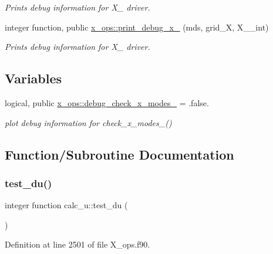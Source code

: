 \begin{DoxyCompactItemize}
\begin{DoxyCompactList}\small\item\em Prints debug information for X\+\_ driver. \end{DoxyCompactList}\item 
integer function, public \hyperlink{namespacex__ops_a8879ea26ad86818e981546c3ab2d6165}{x\+\_\+ops\+::print\+\_\+debug\+\_\+x\+\_} (mds, grid\+\_\+X, X\+\_\+\_\+int)
\begin{DoxyCompactList}\small\item\em Prints debug information for X\+\_ driver. \end{DoxyCompactList}\end{DoxyCompactItemize}
\subsection*{Variables}
\begin{DoxyCompactItemize}
\item 
logical, public \hyperlink{namespacex__ops_a342c624ea5f9a15264c78767da34684c}{x\+\_\+ops\+::debug\+\_\+check\+\_\+x\+\_\+modes\+\_} = .false.
\begin{DoxyCompactList}\small\item\em plot debug information for check\+\_\+x\+\_\+modes\+\_() \end{DoxyCompactList}\end{DoxyCompactItemize}


\subsection{Function/\+Subroutine Documentation}
\mbox{\label{X__ops_8f90_a60ad682c469a085ff3f744ce3191940f}} 
\subsubsection{\texorpdfstring{test\+\_\+du()}{test\_du()}}
{\footnotesize\ttfamily integer function calc\+\_\+u\+::test\+\_\+du (\begin{DoxyParamCaption}{ }\end{DoxyParamCaption})}



Definition at line 2501 of file X\+\_\+ops.\+f90.


